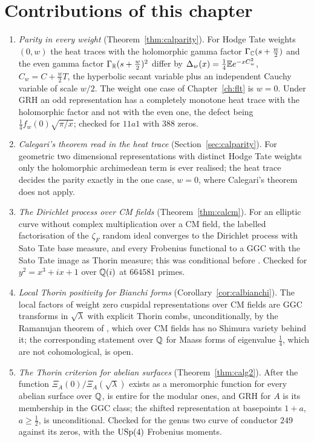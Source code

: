 \section*{Contributions of this chapter}

\begin{enumerate}
\item[(1)] \emph{Parity in every weight} (Theorem~\ref{thm:calparity}). For Hodge Tate weights $(0,w)$ the heat traces with the holomorphic gamma factor $\Gamma_{\mathbb{C}}(s+\frac w2)$ and the even gamma factor $\Gamma_{\mathbb{R}}(s+\frac w2)^2$ differ by $\Delta_w(x)=\frac14\mathbb{E} e^{-xC_w^2}$, $C_w=C+\frac w2T$, the hyperbolic secant variable plus an independent Cauchy variable of scale $w/2$. The weight one case of Chapter~\ref{ch:flt} is $w=0$. Under GRH an odd representation has a completely monotone heat trace with the holomorphic factor and not with the even one, the defect being $\frac14f_w(0)\sqrt{\pi/x}$; checked for $11a1$ with $388$ zeros.
\item[(2)] \emph{Calegari's theorem read in the heat trace} (Section~\ref{sec:calparity}). For geometric two dimensional representations with distinct Hodge Tate weights only the holomorphic archimedean term is ever realised; the heat trace decides the parity exactly in the one case, $w=0$, where Calegari's theorem does not apply.
\item[(3)] \emph{The Dirichlet process over CM fields} (Theorem~\ref{thm:calcm}). For an elliptic curve without complex multiplication over a CM field, the labelled factorisation of the $\zeta_F$ random ideal converges to the Dirichlet process with Sato Tate base measure, and every Frobenius functional to a GGC with the Sato Tate image as Thorin measure; this was conditional before \cite{accghlnstt2023}. Checked for $y^2=x^3+ix+1$ over $\mathbb{Q}(i)$ at $664581$ primes.
\item[(4)] \emph{Local Thorin positivity for Bianchi forms} (Corollary~\ref{cor:calbianchi}). The local factors of weight zero cuspidal representations over CM fields are GGC transforms in $\sqrt\lambda$ with explicit Thorin combs, unconditionally, by the Ramanujan theorem of \cite{accghlnstt2023}, which over CM fields has no Shimura variety behind it; the corresponding statement over $\mathbb{Q}$ for Maass forms of eigenvalue $\frac14$, which are not cohomological, is open.
\item[(5)] \emph{The Thorin criterion for abelian surfaces} (Theorem~\ref{thm:calg2}). After \cite{bcgp2021} the function $\Xi_A(0)/\Xi_A(\sqrt\lambda)$ exists as a meromorphic function for every abelian surface over $\mathbb{Q}$, is entire for the modular ones, and GRH for $A$ is its membership in the GGC class; the shifted representation at basepoints $1+a$, $a\ge\frac12$, is unconditional. Checked for the genus two curve of conductor $249$ against its zeros, with the $\mathrm{USp}(4)$ Frobenius moments.

\end{enumerate}
